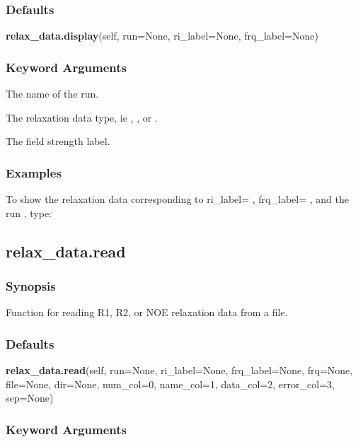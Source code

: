 \subsubsection{Defaults}

\textsf{\textbf{relax\_data.display}(self, run=None, ri\_label=None, frq\_label=None)}


\subsubsection{Keyword Arguments}


  The name of the run.

  The relaxation data type, ie 
, 
, or 
.

  The field strength label.

\subsubsection{Examples}

To show the relaxation data corresponding to ri\_label=
, frq\_label=
, and the run
, type:




\newpage

\subsection{relax\_data.read}


\subsubsection{Synopsis}

Function for reading R1, R2, or NOE relaxation data from a file.

\subsubsection{Defaults}

\textsf{\textbf{relax\_data.read}(self, run=None, ri\_label=None, frq\_label=None, frq=None, file=None, dir=None, num\_col=0, name\_col=1, data\_col=2, error\_col=3, sep=None)}


\subsubsection{Keyword Arguments}


